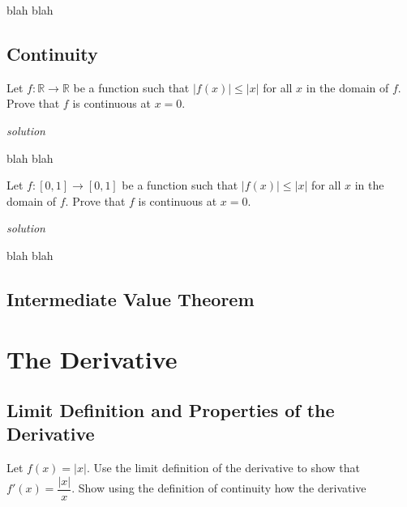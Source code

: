 \documentclass{amsbook}
\begin{document}
\begin{Answer}[ref={2c1}]
	blah blah
\end{Answer}
\section{Continuity}
\begin{Exercise}[title={A Bounded Function around Zero}, difficulty=1 , label=2c1 ]
	Let $f: \mathbb{R} \to \mathbb{R}$ be a function such that $|f(x)| \leq |x| $ for all $x$ in the domain of $f$.  Prove that $f$ is continuous at $x=0$.

	\hfill \emph{solution} 
\end{Exercise}

\begin{Answer}[ref={2c1}]
	blah blah
\end{Answer}

\begin{Exercise}[title={Some Points Don't Move That Much}, difficulty=1 , label=2c2 ]
	Let $f:[0,1] \to [0,1]$ be a function such that $|f(x)| \leq |x| $ for all $x$ in the domain of $f$.  Prove that $f$ is continuous at $x=0$.

	\hfill \emph{solution} 
\end{Exercise}

\begin{Answer}[ref={2c2}]
	blah blah
\end{Answer}


\section{Intermediate Value Theorem}



\chapter{The Derivative}

\section{Limit Definition and Properties of the Derivative}
\begin{Exercise}[title={Introducing a Discontinuity}, difficulty=0, label=3a1]
Let $f(x)=|x|$. Use the limit definition of the derivative to show that $f'(x)=\dfrac{|x|}{x}$. Show using the definition of continuity how the derivative 

\end{Exercise}
\end{document}

